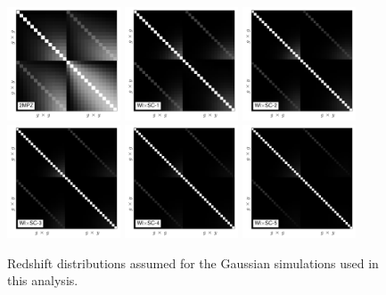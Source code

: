 \documentclass[useAMS,usenatbib]{mn2e}
\begin{document}
  \begin{figure}
    \centering
    \includegraphics[width=0.3\textwidth]{./figures/cov_2mpz.pdf}
    \includegraphics[width=0.3\textwidth]{./figures/cov_wisc1.pdf}
    \includegraphics[width=0.3\textwidth]{./figures/cov_wisc2.pdf}
    \includegraphics[width=0.3\textwidth]{./figures/cov_wisc3.pdf}
    \includegraphics[width=0.3\textwidth]{./figures/cov_wisc4.pdf}
    \includegraphics[width=0.3\textwidth]{./figures/cov_wisc5.pdf}
    \caption{Redshift distributions assumed for the Gaussian simulations used in this analysis.}
    \label{fig:covs}
  \end{figure}
\end{document}

